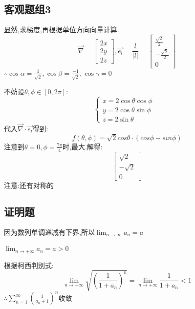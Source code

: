 \documentclass[a4paper,12pt]{ctexrep}
\begin{document}
\newpage

\subsection{客观题组3}
显然,求梯度,再根据单位方向向量计算.
$$\overrightarrow{\nabla}=\begin{bmatrix}2x\\2y\\2z\end{bmatrix},
\overrightarrow{e_{l}}=\frac{l}{|l|}=\begin{bmatrix}\frac{\sqrt{2}}{2}\\-\frac{\sqrt{2}}{2}\\0\end{bmatrix}$$
$\therefore \cos\alpha=\frac{1}{\sqrt{2}},\cos\beta=\frac{-1}{\sqrt{2}},\cos\gamma=0$

不妨设$\theta,\phi \in [0,2\pi]$:
$$\begin{cases}x=2\cos\theta\cos \phi\\y=2\cos\theta\sin \phi\\z=2\sin\theta&\end{cases}$$
代入$\overrightarrow{\nabla}  \cdot \overrightarrow{e_{l}}$得到:
$$ f(\theta,\phi) = \sqrt{2} cos\theta\cdot (cos \phi - sin \phi )$$
注意到$ \theta = 0, \phi = \frac{7\pi}{4} $时,最大.解得:
$$\begin{bmatrix}\sqrt{2} \\ -\sqrt{2} \\0\end{bmatrix}$$
注意:还有对称的

\newpage

\subsection{证明题}
因为数列单调递减有下界,所以$\operatorname*{lim}_{n\to\infty}a_{n}=a$

$\operatorname*{lim}_{n\rightarrow+\infty}a_{n} = a > 0$

根据柯西判别式:
\begin{equation*}
	\operatorname*{lim}_{n\rightarrow+\infty}\sqrt{(\frac{1}{1+a_{n}})^{n}}=\operatorname*{lim}_{n\rightarrow+\infty}\frac{1}{1+a_{n}}  < 1
\end{equation*}
$\therefore \sum_{n=1}^\infty\left(\frac{1}{a_n+1}\right)^n$收敛
\end{document}
